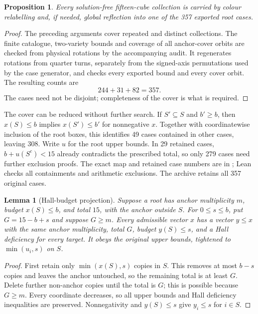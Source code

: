 \documentclass[11pt]{article}
\newtheorem{lemma}[theorem]{Lemma}
\newtheorem{proposition}[theorem]{Proposition}
\theoremstyle{remark}
\begin{document}
\begin{proposition}\label{prop:cover}
Every solution-free fifteen-cube collection is carried by colour relabelling
and, if needed, global reflection into one of the 357 exported root cases.
\end{proposition}
\begin{proof}
The preceding arguments cover repeated and distinct collections. The finite
catalogue, two-variety bounds and coverage of all anchor-cover orbits are
checked from physical rotations by the accompanying audit. It regenerates
rotations from quarter turns, separately from the signed-axis permutations
used by the case generator, and checks every exported bound and every cover
orbit. The resulting counts are
\[
  244+31+82=357.
\]
The cases need not be disjoint; completeness of the cover is what is required.
\end{proof}

The cover can be reduced without further search. If $S'\subseteq S$ and
$b'\ge b$, then $x(S)\le b$ implies $x(S')\le b'$ for nonnegative $x$.
Together with coordinatewise inclusion of the root boxes, this identifies
49 cases contained in other cases, leaving 308. Write $u$ for the root upper
bounds. In 29 retained cases, $b+u(S^c)<15$ already contradicts the prescribed
total, so only 279 cases
need further exclusion proofs. The exact map and retained case numbers are
in ; Lean checks all containments and
arithmetic exclusions. The archive retains all 357 original cases.

\begin{lemma}[Hall-budget projection]\label{lem:projection}
Suppose a root has anchor multiplicity $m$, budget $x(S)\le b$, and total
$15$, with the anchor outside $S$. For $0\le s\le b$, put $G=15-b+s$
and suppose $G\ge m$. Every admissible vector $x$ has a vector $y\le x$
with the same anchor multiplicity, total $G$, budget $y(S)\le s$, and a
Hall deficiency for every target. It obeys the original upper bounds,
tightened to $\min(u_i,s)$ on $S$.
\end{lemma}
\begin{proof}
First retain only $\min(x(S),s)$ copies in $S$. This removes at most $b-s$
copies and leaves the anchor untouched, so the remaining total is at least
$G$. Delete further non-anchor copies until the total is $G$; this is possible
because $G\ge m$. Every coordinate decreases, so all upper bounds and Hall
deficiency inequalities are preserved. Nonnegativity and $y(S)\le s$ give
$y_i\le s$ for $i\in S$.
\end{proof}
\end{document}
